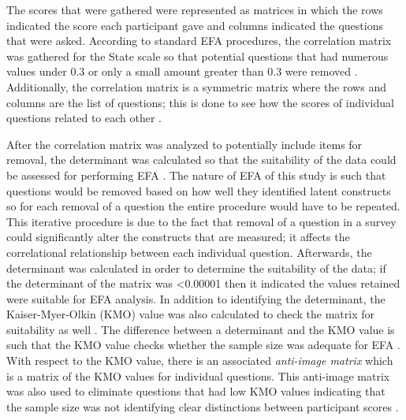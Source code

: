 \documentclass[twoside,twocolumn]{article}
\begin{document}
The scores that were gathered were represented as matrices in which the rows indicated the score each participant gave and columns indicated the questions that were asked. According to standard EFA procedures, the correlation matrix was gathered for the State scale so that potential questions that had numerous values under 0.3 or only a small amount greater than 0.3 were removed \cite{efa}. Additionally, the correlation matrix is a symmetric matrix where the rows and columns are the list of questions; this is done to see how the scores of individual questions related to each other \cite{efa}.

After the correlation matrix was analyzed to potentially include items for removal, the determinant was calculated so that the suitability of the data could be assessed for performing EFA \cite{efa}. The nature of EFA of this study is such that questions would be removed based on how well they identified latent constructs so for each removal of a question the entire procedure would have to be repeated. This iterative procedure is due to the fact that removal of a question in a survey could significantly alter the constructs that are measured; it affects the correlational relationship between each individual question. Afterwards, the determinant was calculated in order to determine the suitability of the data; if the determinant of the matrix was <0.00001 then it indicated the values retained were suitable for EFA analysis. In addition to identifying the determinant, the Kaiser-Myer-Olkin (KMO) value was also calculated to check the matrix for suitability as well \cite{efa}. The difference between a determinant and the KMO value is such that the KMO value checks whether the sample size was adequate for EFA \cite{efa}. With respect to the KMO value, there is an associated \emph{anti-image matrix} which is a matrix of the KMO values for individual questions. This anti-image matrix was also used to eliminate questions that had low KMO values indicating that the sample size was not identifying clear distinctions between participant scores \cite{efa}.
\end{document}
